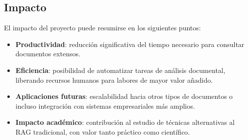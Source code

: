 \subsection{Impacto}
El impacto del proyecto puede resumirse en los siguientes puntos:  
\begin{itemize}
    \item \textbf{Productividad}: reducción significativa del tiempo necesario para consultar documentos extensos.  
    \item \textbf{Eficiencia}: posibilidad de automatizar tareas de análisis documental, liberando recursos humanos para labores de mayor valor añadido.  
    \item \textbf{Aplicaciones futuras}: escalabilidad hacia otros tipos de documentos o incluso integración con sistemas empresariales más amplios.  
    \item \textbf{Impacto académico}: contribución al estudio de técnicas alternativas al RAG tradicional, con valor tanto práctico como científico.  
\end{itemize}
